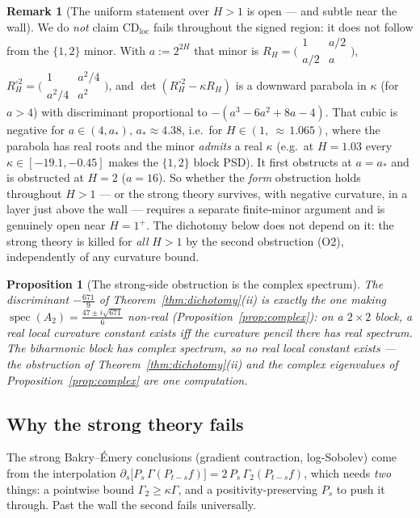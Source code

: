 \documentclass[11pt,reqno]{amsart}
\theoremstyle{plain}
\newtheorem{proposition}[theorem]{Proposition}
\theoremstyle{definition}
\newtheorem{remark}[theorem]{Remark}
\newcommand{\Had}{\mathbin{\circ}}
\newcommand{\Gam}{\Gamma}
\DeclareMathOperator{\spec}{spec}
\begin{document}
\begin{remark}[The uniform statement over $H>1$ is open --- and subtle near the wall]
\label{rem:uniform}
We do \emph{not} claim $\mathrm{CD}_{\mathrm{loc}}$ fails throughout the signed
region: it does not follow from the $\{1,2\}$ minor. With $a:=2^{2H}$ that minor
is $R_H=\bigl(\begin{smallmatrix}1&a/2\\a/2&a\end{smallmatrix}\bigr)$,
$R_H^{\Had2}=\bigl(\begin{smallmatrix}1&a^2/4\\a^2/4&a^2\end{smallmatrix}\bigr)$,
and $\det(R_H^{\Had2}-\kappa R_H)$ is a downward parabola in $\kappa$ (for $a>4$)
with discriminant proportional to $-(a^3-6a^2+8a-4)$. That cubic is negative for
$a\in(4,a_*)$, $a_*\approx4.38$, i.e.\ for $H\in(1,\ {\approx}\,1.065)$, where the
parabola has real roots and the minor \emph{admits} a real $\kappa$ (e.g.\ at
$H=1.03$ every $\kappa\in[-19.1,-0.45]$ makes the $\{1,2\}$ block PSD). It first
obstructs at $a=a_*$ and is obstructed at $H=2$ ($a=16$). So whether the
\emph{form} obstruction holds throughout $H>1$ --- or the strong theory survives,
with negative curvature, in a layer just above the wall --- requires a separate
finite-minor argument and is genuinely open near $H=1^+$. The dichotomy below does
not depend on it: the strong theory is killed for \emph{all} $H>1$ by the second
obstruction (O2), independently of any curvature bound.
\end{remark}

\begin{proposition}[The strong-side obstruction is the complex spectrum]\label{prop:disc}
The discriminant $-\tfrac{671}{9}$ of Theorem~\ref{thm:dichotomy}(ii) is exactly
the one making $\spec(A_2)=\tfrac{47\pm i\sqrt{671}}{6}$ non-real
(Proposition~\ref{prop:complex}): on a $2\times2$ block, a real local curvature
constant exists iff the curvature pencil there has real spectrum. The biharmonic
block has complex spectrum, so no real local constant exists --- the obstruction
of Theorem~\ref{thm:dichotomy}(ii) and the complex eigenvalues of
Proposition~\ref{prop:complex} are one computation.
\end{proposition}

\subsection{Why the strong theory fails}
The strong Bakry--\'Emery conclusions (gradient contraction, log-Sobolev) come
from the interpolation
$\partial_s\bigl[P_s\,\Gam(P_{t-s}f)\bigr]=2\,P_s\,\Gam_2(P_{t-s}f)$, which needs
\emph{two} things: a pointwise bound $\Gam_2\ge\kappa\Gam$, and a
positivity-preserving $P_s$ to push it through. Past the wall the second fails
universally.
\end{document}

